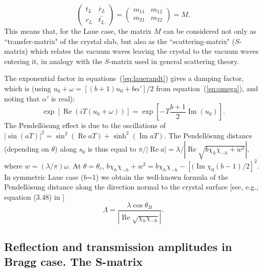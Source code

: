 \documentclass{iucr}
\begin{document}
\begin{equation}\label{eq:MtransferLaue}
    \begin{pmatrix}
    t_L & \bar{r}_L\\
    r_L & \bar{t_L}
    \end{pmatrix}
    =
    \begin{pmatrix}
    m_{11} & m_{12}\\
    m_{21} & m_{22}
    \end{pmatrix}
    = M.
\end{equation}
This means that, for the Laue case, the matrix $M$ can be considered not only as ``transfer-matrix" of the crystal slab, but also as the ``scattering-matrix" ($S$-matrix) which relates the vacuum waves leaving the crystal to the vacuum waves entering it, in analogy with the $S$-matrix used in general scattering theory.  

The exponential factor in equations~(\ref{eq:lauerandt}) gives a damping factor, which is (using $u_0 +\omega=[(b+1)u_0+b\alpha']/2$ from equation~({\ref{eq:omega}}), 
and noting that $\alpha'$ is real):  
\begin{equation}
   \exp[\operatorname{Re}(iT(u_0+\omega))] = 
    \exp[-T \frac{b+1}{2}\operatorname{Im}(u_0)].
\end{equation}
The Pendell\"osung effect is due to the oscillations of $|\sin(aT)|^2=\sin^2(\operatorname{Re} aT) + \sinh^2(\operatorname{Im}aT)$.
The Pendell\"osung distance (depending on $\theta$) along $s_0$ is thus equal to  
$\pi / |\operatorname{Re} a|=\lambda / |\operatorname{Re}\sqrt{b\chi_h\chi_{-h} + w^2}|$, where $w=(\lambda / \pi) \omega $.
At $\theta=\theta_c$, $b \chi_h \chi_{-h}+w^2=b \chi_h \chi_{-h} - [(\operatorname{Im}\chi_0(b-1)/2]^2$. In symmetric Laue case ($b$=1) we obtain the well-known formula of the Pendell\"osung distance along the direction normal to the crystal surface [see, e.g., equation (3.48) in \cite{pinskerbook}]
\begin{equation}\label{eq:Pendellosung}
    \Lambda =\frac{\lambda \cos\theta_B}{|\operatorname{Re}\sqrt{\chi_h\chi_{-h}}|} .
\end{equation}

\subsection{Reflection and transmission amplitudes in Bragg case. The S-matrix}
\label{sec:TTsolutionsBragg}
\end{document}
